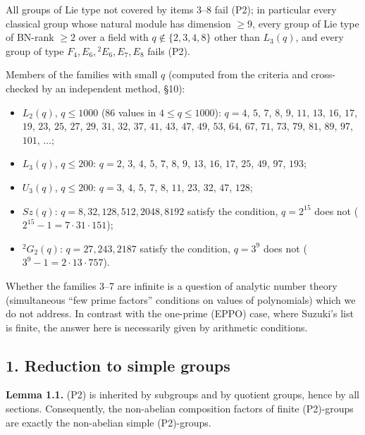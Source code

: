 \documentclass[11pt,a4paper]{article}
\providecommand{\tightlist}{\setlength{\itemsep}{1pt}\setlength{\parskip}{0pt}}
\begin{document}
All groups of Lie type not covered by items 3--8 fail (P2); in
particular every classical group whose natural module has dimension
\(\ge 9\), every group of Lie type of BN-rank \(\ge 2\) over a field
with \(q\notin\{2,3,4,8\}\) other than \(L_3(q)\), and every group of
type \(F_4, E_6, {}^2E_6, E_7, E_8\) fails (P2).

Members of the families with small \(q\) (computed from the criteria and
cross-checked by an independent method, §10):

\begin{itemize}
\tightlist
\item
  \(L_2(q)\), \(q\le 1000\) (86 values in \(4\le q\le 1000\)): \(q=4\),
  \(5\), \(7\), \(8\), \(9\), \(11\), \(13\), \(16\), \(17\), \(19\),
  \(23\), \(25\), \(27\), \(29\), \(31\), \(32\), \(37\), \(41\),
  \(43\), \(47\), \(49\), \(53\), \(64\), \(67\), \(71\), \(73\),
  \(79\), \(81\), \(89\), \(97\), \(101\), \(\dots\);
\item
  \(L_3(q)\), \(q\le 200\): \(q=2\), \(3\), \(4\), \(5\), \(7\), \(8\),
  \(9\), \(13\), \(16\), \(17\), \(25\), \(49\), \(97\), \(193\);
\item
  \(U_3(q)\), \(q\le 200\): \(q=3\), \(4\), \(5\), \(7\), \(8\), \(11\),
  \(23\), \(32\), \(47\), \(128\);
\item
  \(Sz(q)\): \(q=8,32,128,512,2048,8192\) satisfy the condition,
  \(q=2^{15}\) does not (\(2^{15}-1=7\cdot31\cdot151\));
\item
  \({}^2G_2(q)\): \(q=27,243,2187\) satisfy the condition, \(q=3^9\)
  does not (\(3^9-1=2\cdot 13\cdot 757\)).
\end{itemize}

Whether the families 3--7 are infinite is a question of analytic number
theory (simultaneous ``few prime factors'' conditions on values of
polynomials) which we do not address. In contrast with the one-prime
(EPPO) case, where Suzuki's list is finite, the answer here is
necessarily given by arithmetic conditions.

\subsection{1. Reduction to simple
groups}\label{reduction-to-simple-groups}

\textbf{Lemma 1.1.} (P2) is inherited by subgroups and by quotient
groups, hence by all sections. Consequently, the non-abelian composition
factors of finite (P2)-groups are exactly the non-abelian simple
(P2)-groups.
\end{document}
